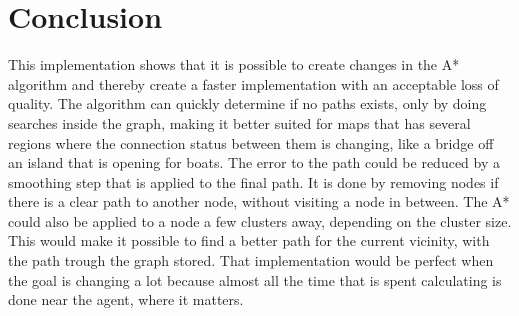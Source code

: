 \documentclass[12 pt]{article} %
\begin{document}
\section{Conclusion}
This implementation shows that it is possible to create changes in the A* algorithm and thereby create a faster implementation with an acceptable loss of quality.
The algorithm can quickly determine if no paths exists, only by doing searches inside the graph, making it better suited for maps that has several regions where the connection status between them is changing, like a bridge off an island that is opening for boats.
The error to the path could be reduced by a smoothing step that is applied to the final path.
It is done by removing nodes if there is a clear path to another node, without visiting a node in between.
The A* could also be applied to a node a few clusters away, depending on the cluster size.
This would make it possible to find a better path for the current vicinity, with the path trough the graph stored.
That implementation would be perfect when the goal is changing a lot because almost all the time that is spent calculating is done near the agent, where it matters.
\end{document}

